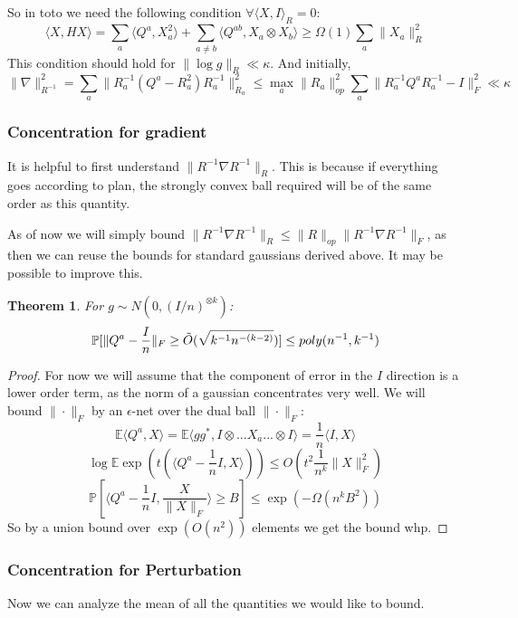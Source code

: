 \documentclass{article}
\newtheorem{theorem}{Theorem}
\newcommand{\E}{\mathbb{E}}
\renewcommand{\Pr}{\mathbb{P}}
\begin{document}
So in toto we need the following condition $\forall \langle X, I \rangle_{R} = 0$:
\[ \langle X, H X \rangle = \sum_{a} \langle Q^{a}, X_{a}^{2} \rangle + \sum_{a \neq b} \langle Q^{ab}, X_{a} \otimes X_{b} \rangle \geq \Omega(1) \sum_{a} \|X_{a}\|_{R}^{2}  \]
This condition should hold for $\|\log g\|_{R} \ll \kappa$. And initially,
\[ \|\nabla\|_{R^{-1}}^{2} = \sum_{a} \|R_{a}^{-1} (Q^{a} - R_{a}^{2}) R_{a}^{-1} \|_{R_{a}}^{2} \leq \max_{a} \|R_{a}\|_{op}^{2} \sum_{a} \|R_{a}^{-1} Q^{a} R_{a}^{-1} - I\|_{F}^{2} \ll \kappa  \]

\subsubsection{Concentration for gradient}
It is helpful to first understand $\|R^{-1} \nabla R^{-1}\|_{R}$. This is because if everything goes according to plan, the strongly convex ball required will be of the same order as this quantity. 

As of now we will simply bound $\|R^{-1} \nabla R^{-1}\|_{R} \leq \|R\|_{op} \|R^{-1} \nabla R^{-1}\|_{F}$, as then we can reuse the bounds for standard gaussians derived above. It may be possible to improve this. 

\begin{theorem}
For $g \sim N(0,(I/n)^{\otimes k})$:
\[ \Pr[\|Q^{a} - \frac{I}{n}\|_{F} \geq \Tilde{O}(\sqrt{k^{-1} n^{-(k-2)}})] \leq poly(n^{-1},k^{-1})  \]
\end{theorem}
\begin{proof}
For now we will assume that the component of error in the $I$ direction is a lower order term, as the norm of a gaussian concentrates very well. We will bound $\|\cdot\|_{F}$ by an $\epsilon$-net over the dual ball $\|\cdot\|_{F}$:
\[ \E \langle Q^{a}, X \rangle = \E \langle g g^{*}, I \otimes ... X_{a} ... \otimes I \rangle = \frac{1}{n} \langle I, X \rangle  \]
\[ \log \E \exp( t(\langle Q^{a} - \frac{1}{n} I, X \rangle)) \leq O \left( t^{2} \frac{1}{n^{k}} \|X\|_{F}^{2} \right)   \]
\[ \Pr[\langle Q^{a} - \frac{1}{n} I, \frac{X}{\|X\|_{F}} \rangle \geq B] \leq \exp( - \Omega(n^{k} B^{2}) )  \]
So by a union bound over $\exp(O(n^{2}))$ elements we get the bound whp.  
\end{proof}

\subsubsection{Concentration for Perturbation}
Now we can analyze the mean of all the quantities we would like to bound. 
\end{document}
